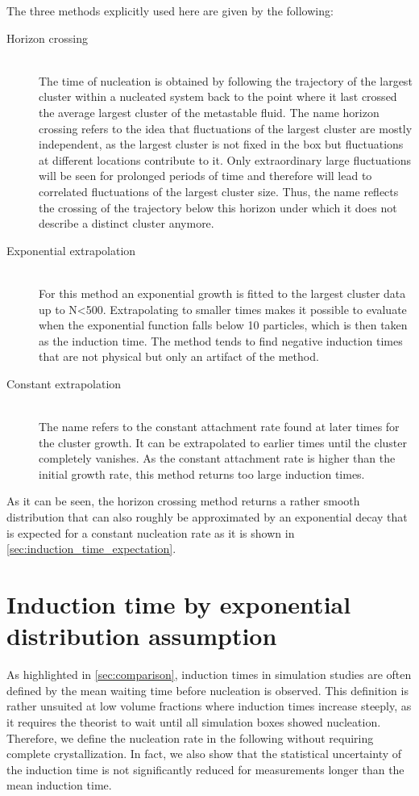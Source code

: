 The three methods explicitly used here are given by the following:
\begin{description}
\item[Horizon crossing]{\hfill \\The time of nucleation is obtained by following the trajectory of the largest cluster within a nucleated system back to the point where it last crossed the average largest cluster of the metastable fluid. The name horizon crossing refers to the idea that fluctuations of the largest cluster are mostly independent, as the largest cluster is not fixed in the box but fluctuations at different locations contribute to it. Only extraordinary large fluctuations will be seen for prolonged periods of time and therefore will lead to correlated fluctuations of the largest cluster size. Thus, the name reflects the crossing of the trajectory below this horizon under which it does not describe a distinct cluster anymore.}

\item[Exponential extrapolation]{\hfill \\For this method an exponential growth is fitted to the largest cluster data up to N<500. Extrapolating to smaller times makes it possible to evaluate when the exponential function falls below 10 particles, which is then taken as the induction time. The method tends to find negative induction times that are not physical but only an artifact of the method.}

\item[Constant extrapolation]{\hfill \\The name refers to the constant attachment rate found at later times for the cluster growth. It can be extrapolated to earlier times until the cluster completely vanishes. As the constant attachment rate is higher than the initial growth rate, this method returns too large induction times.}
\end{description}

As it can be seen, the horizon crossing method returns a rather smooth distribution that can also roughly be approximated by an exponential decay that is expected for a constant nucleation rate as it is shown in \autoref{sec:induction_time_expectation}.

\section{Induction time by exponential distribution assumption}
\label{sec:induction_times}
As highlighted in \autoref{sec:comparison}, induction times in simulation studies are often defined by the mean waiting time before nucleation is observed. This definition is rather unsuited at low volume fractions where induction times increase steeply, as it requires the theorist to wait until all simulation boxes showed nucleation. Therefore, we define the nucleation rate in the following without requiring complete crystallization. In fact, we also show that the statistical uncertainty of the induction time is not significantly reduced for measurements longer than the mean induction time.

